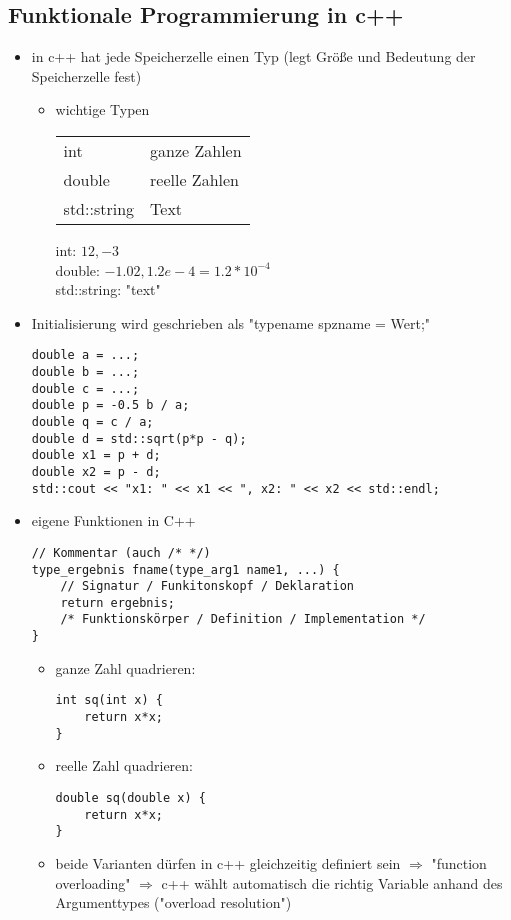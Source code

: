 \documentclass[a4paper]{scrartcl}
\begin{document}
\subsection{Funktionale Programmierung in c++}
\label{sec-8-3}
\begin{itemize}
\item in c++ hat jede Speicherzelle einen Typ (legt Größe und Bedeutung der Speicherzelle fest)
\begin{itemize}
\item wichtige Typen
\begin{center}
\begin{tabular}{ll}
int & ganze Zahlen\\
double & reelle Zahlen\\
std::string & Text\\
\end{tabular}
\end{center}
int: $12,-3$ \\
       double: $-1.02,1.2e-4 = 1.2*10^{-4}$ \\
       std::string: "text"
\end{itemize}
\item Initialisierung wird geschrieben als "typename spzname = Wert;"
\begin{verbatim}
double a = ...;
double b = ...;
double c = ...;
double p = -0.5 b / a;
double q = c / a;
double d = std::sqrt(p*p - q);
double x1 = p + d;
double x2 = p - d;
std::cout << "x1: " << x1 << ", x2: " << x2 << std::endl;
\end{verbatim}
\item eigene Funktionen in C++
\begin{verbatim}
// Kommentar (auch /* */)
type_ergebnis fname(type_arg1 name1, ...) {
	// Signatur / Funkitonskopf / Deklaration
	return ergebnis;
	/* Funktionskörper / Definition / Implementation */
}
\end{verbatim}
\begin{itemize}
\item ganze Zahl quadrieren:
\begin{verbatim}
int sq(int x) {
	return x*x;
}
\end{verbatim}
\item reelle Zahl quadrieren:
\begin{verbatim}
double sq(double x) {
	return x*x;
}
\end{verbatim}
\item beide Varianten dürfen in c++ gleichzeitig definiert sein $\Rightarrow$ "function overloading" $\Rightarrow$ c++ wählt automatisch die richtig Variable anhand des Argumenttypes ("overload resolution")

\end{itemize}
\end{itemize}
\end{document}
